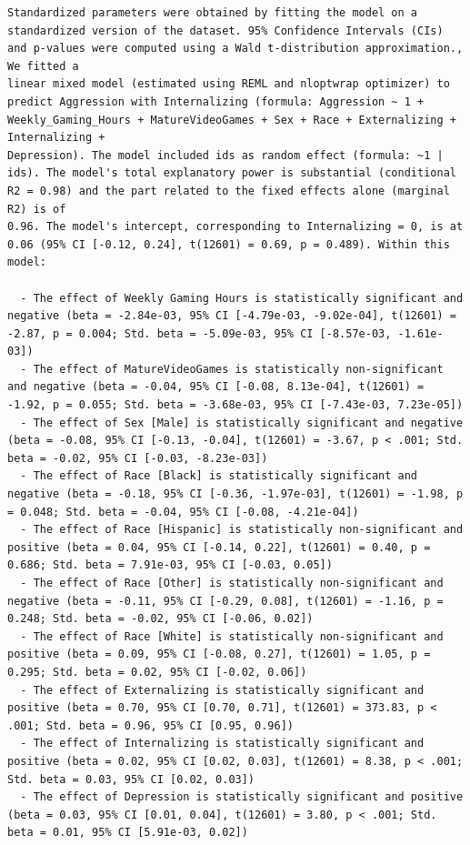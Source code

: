 \documentclass{article}
\begin{document}
\begin{verbatim}
Standardized parameters were obtained by fitting the model on a standardized version of the dataset. 95% Confidence Intervals (CIs) and p-values were computed using a Wald t-distribution approximation., We fitted a
linear mixed model (estimated using REML and nloptwrap optimizer) to predict Aggression with Internalizing (formula: Aggression ~ 1 + Weekly_Gaming_Hours + MatureVideoGames + Sex + Race + Externalizing + Internalizing +
Depression). The model included ids as random effect (formula: ~1 | ids). The model's total explanatory power is substantial (conditional R2 = 0.98) and the part related to the fixed effects alone (marginal R2) is of
0.96. The model's intercept, corresponding to Internalizing = 0, is at 0.06 (95% CI [-0.12, 0.24], t(12601) = 0.69, p = 0.489). Within this model:

  - The effect of Weekly Gaming Hours is statistically significant and negative (beta = -2.84e-03, 95% CI [-4.79e-03, -9.02e-04], t(12601) = -2.87, p = 0.004; Std. beta = -5.09e-03, 95% CI [-8.57e-03, -1.61e-03])
  - The effect of MatureVideoGames is statistically non-significant and negative (beta = -0.04, 95% CI [-0.08, 8.13e-04], t(12601) = -1.92, p = 0.055; Std. beta = -3.68e-03, 95% CI [-7.43e-03, 7.23e-05])
  - The effect of Sex [Male] is statistically significant and negative (beta = -0.08, 95% CI [-0.13, -0.04], t(12601) = -3.67, p < .001; Std. beta = -0.02, 95% CI [-0.03, -8.23e-03])
  - The effect of Race [Black] is statistically significant and negative (beta = -0.18, 95% CI [-0.36, -1.97e-03], t(12601) = -1.98, p = 0.048; Std. beta = -0.04, 95% CI [-0.08, -4.21e-04])
  - The effect of Race [Hispanic] is statistically non-significant and positive (beta = 0.04, 95% CI [-0.14, 0.22], t(12601) = 0.40, p = 0.686; Std. beta = 7.91e-03, 95% CI [-0.03, 0.05])
  - The effect of Race [Other] is statistically non-significant and negative (beta = -0.11, 95% CI [-0.29, 0.08], t(12601) = -1.16, p = 0.248; Std. beta = -0.02, 95% CI [-0.06, 0.02])
  - The effect of Race [White] is statistically non-significant and positive (beta = 0.09, 95% CI [-0.08, 0.27], t(12601) = 1.05, p = 0.295; Std. beta = 0.02, 95% CI [-0.02, 0.06])
  - The effect of Externalizing is statistically significant and positive (beta = 0.70, 95% CI [0.70, 0.71], t(12601) = 373.83, p < .001; Std. beta = 0.96, 95% CI [0.95, 0.96])
  - The effect of Internalizing is statistically significant and positive (beta = 0.02, 95% CI [0.02, 0.03], t(12601) = 8.38, p < .001; Std. beta = 0.03, 95% CI [0.02, 0.03])
  - The effect of Depression is statistically significant and positive (beta = 0.03, 95% CI [0.01, 0.04], t(12601) = 3.80, p < .001; Std. beta = 0.01, 95% CI [5.91e-03, 0.02])


\end{verbatim}
\end{document}
